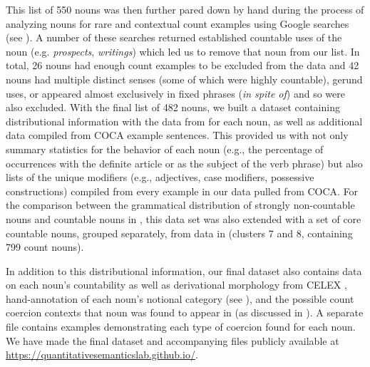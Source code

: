 \documentclass[output=paper]{langscibook}
\begin{document}
This list of 550 nouns was then further pared down by hand during the process of analyzing nouns for rare and contextual count examples using Google searches (see ). A number of these searches returned established countable uses of the noun (e.g. \textit{prospects}, \textit{writings})  which led us to remove that noun from our list. In total, 26 nouns had enough count examples to be excluded from the data and 42 nouns had multiple distinct senses (some of which were highly countable), gerund uses, or appeared almost exclusively in fixed phrases (\textit{in spite of}) and so were also excluded. With the final list of 482 nouns, we built a dataset containing distributional information with the data from \citet{GrimmWahlang2020} for each noun, as well as additional data compiled from COCA example sentences. This provided us with not only summary statistics for the behavior of each noun (e.g., the percentage of occurrences with the definite article or as the subject of the verb phrase) but also lists of the unique modifiers (e.g., adjectives, case modifiers, possessive constructions) compiled from every example in our data pulled from COCA. For the comparison between the grammatical distribution of strongly non-countable nouns and countable nouns in , this data set was also extended with a set of core countable nouns, grouped separately, from data in \citet{GrimmWahlang2020} (clusters 7 and 8, containing 799 count nouns).

In addition to this distributional information, our final dataset also contains data on each noun's countability as well as derivational morphology from CELEX \citep{CELEX}, hand-annotation of each noun's notional category (see ), and the possible count coercion contexts that noun was found to appear in (as discussed in ). A separate file contains examples demonstrating each type of coercion found for each noun. We have made the final dataset and accompanying files publicly available at \url{https://quantitativesemanticslab.github.io/}.

\end{document}
